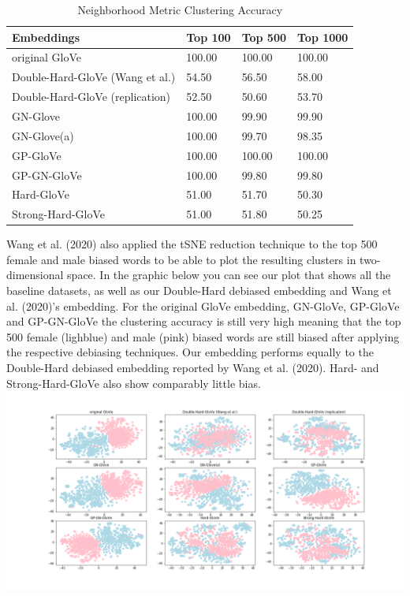 \documentclass[
  english,
  man,floatsintext]{apa6}
\begin{document}
\begin{table}[tbp]

\begin{center}
\begin{threeparttable}

\caption{\label{tab:table 2}Neighborhood Metric Clustering Accuracy}

\begin{tabular}{llll}
\toprule
Embeddings & Top 100 & Top 500 & Top 1000\\
\midrule
original GloVe & 100.00 & 100.00 & 100.00\\
Double-Hard-GloVe (Wang et al.) & 54.50 & 56.50 & 58.00\\
Double-Hard-GloVe (replication) & 52.50 & 50.60 & 53.70\\
GN-Glove & 100.00 & 99.90 & 99.90\\
GN-Glove(a) & 100.00 & 99.70 & 98.35\\
GP-GloVe & 100.00 & 100.00 & 100.00\\
GP-GN-GloVe & 100.00 & 99.80 & 99.80\\
Hard-GloVe & 51.00 & 51.70 & 50.30\\
Strong-Hard-GloVe & 51.00 & 51.80 & 50.25\\
\bottomrule
\end{tabular}

\end{threeparttable}
\end{center}

\end{table}

Wang et al. (2020) also applied the tSNE reduction technique to the top 500 female and male biased words to be able to plot the resulting clusters in two-dimensional space. In the graphic below you can see our plot that shows all the baseline datasets, as well as our Double-Hard debiased embedding and Wang et al. (2020)'s embedding. For the original GloVe embedding, GN-GloVe, GP-GloVe and GP-GN-GloVe the clustering accuracy is still very high meaning that the top 500 female (lighblue) and male (pink) biased words are still biased after applying the respective debiasing techniques. Our embedding performs equally to the Double-Hard debiased embedding reported by Wang et al. (2020). Hard- and Strong-Hard-GloVe also show comparably little bias.
\includegraphics{evaluation_results/results_tsne.png}
\end{document}
